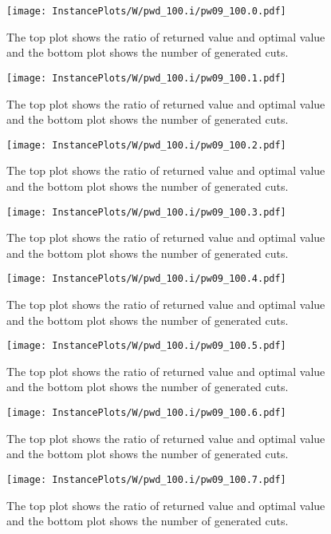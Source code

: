 \documentclass[10pt,a4paper]{article}
\begin{document}
\begin{figure}[H]
\texttt{[image: InstancePlots/W/pwd\_100.i/pw09\_100.0.pdf]}
\caption{The top plot shows the ratio of returned value and optimal value     and the bottom plot shows the number of generated cuts.}
\end{figure}

\begin{figure}[H]
\texttt{[image: InstancePlots/W/pwd\_100.i/pw09\_100.1.pdf]}
\caption{The top plot shows the ratio of returned value and optimal value     and the bottom plot shows the number of generated cuts.}
\end{figure}

\begin{figure}[H]
\texttt{[image: InstancePlots/W/pwd\_100.i/pw09\_100.2.pdf]}
\caption{The top plot shows the ratio of returned value and optimal value     and the bottom plot shows the number of generated cuts.}
\end{figure}

\begin{figure}[H]
\texttt{[image: InstancePlots/W/pwd\_100.i/pw09\_100.3.pdf]}
\caption{The top plot shows the ratio of returned value and optimal value     and the bottom plot shows the number of generated cuts.}
\end{figure}

\begin{figure}[H]
\texttt{[image: InstancePlots/W/pwd\_100.i/pw09\_100.4.pdf]}
\caption{The top plot shows the ratio of returned value and optimal value     and the bottom plot shows the number of generated cuts.}
\end{figure}

\begin{figure}[H]
\texttt{[image: InstancePlots/W/pwd\_100.i/pw09\_100.5.pdf]}
\caption{The top plot shows the ratio of returned value and optimal value     and the bottom plot shows the number of generated cuts.}
\end{figure}

\begin{figure}[H]
\texttt{[image: InstancePlots/W/pwd\_100.i/pw09\_100.6.pdf]}
\caption{The top plot shows the ratio of returned value and optimal value     and the bottom plot shows the number of generated cuts.}
\end{figure}

\begin{figure}[H]
\texttt{[image: InstancePlots/W/pwd\_100.i/pw09\_100.7.pdf]}
\caption{The top plot shows the ratio of returned value and optimal value     and the bottom plot shows the number of generated cuts.}
\end{figure}
\end{document}
